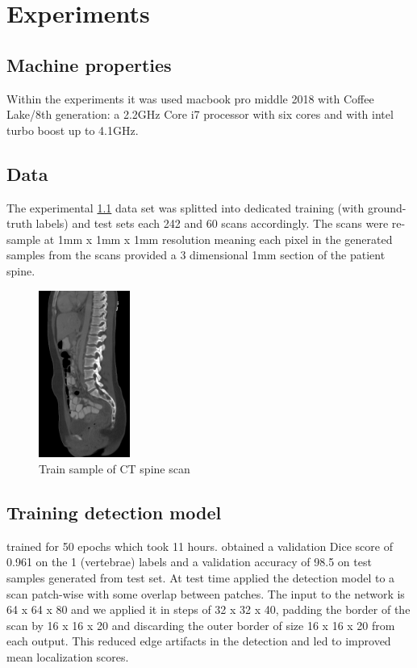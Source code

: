 \chapter{Experiments}
\label{ch:experiments}


\section{Machine properties}
Within the experiments it was used macbook pro middle 2018 with Coffee Lake/8th generation: a 2.2GHz Core i7 processor with six cores and with intel turbo boost up to 4.1GHz.

\section{Data}
The experimental \ref{fig:ct_spine} data set was splitted into dedicated training (with ground-truth labels) and test sets each 242 and 60 scans accordingly. The scans were re-sample  at 1mm x 1mm x 1mm resolution meaning each pixel in the generated samples from the scans provided a 3 dimensional 1mm section of the patient spine.
\begin{figure}[h]
    \centering \includegraphics[width=3cm]{images/ct-spine.jpg}
    \caption {Train sample of CT spine scan}
    \label{fig:ct_spine}
\end{figure}


\section{Training detection model}
trained for 50 epochs which took 11 hours. obtained a validation Dice score of 0.961 on the 1 (vertebrae) labels and a validation accuracy of 98.5 on test samples generated from test set.
At test time applied the detection model to a scan patch-wise with some overlap between patches. The input to the network is 64 x 64 x 80 and we applied it in steps of 32 x 32 x 40, padding the border of the scan by 16 x 16 x 20 and discarding the outer border of size 16 x 16 x 20 from each output. This reduced edge artifacts in the detection and led to improved mean localization scores.

